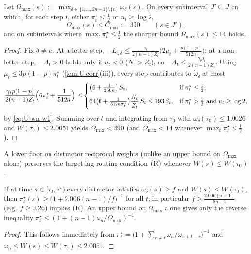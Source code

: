 \begin{lemma}
\label{lem:U-floor-max}
Let $\Omega_{\max}(s) := \max_{\delta\in\{1,\ldots,2n+1\}\setminus\{n\}}\omega_\delta(s)$. On every subinterval $J' \subseteq J$ on which, for each step $t$, either $\pi_t^\star \le \frac12$ or $u_t \ge \log 2$,
\[
  \Omega_{\max}(s) \le C_{\max} := 390 \qquad (s \in J'),
\]
and on subintervals where $\max_t\pi_t^\star \le \frac12$ the sharper bound $\Omega_{\max}(s) \le 14$ holds.
\end{lemma}
\begin{proof}
Fix $\delta \ne n$. At a letter step, $-L_{t,\delta} \le \frac{\gamma_t}{2(n-1)Z_t}\bigl(2\mu_t + \frac{p(1-p)}{512n}\bigr)$; at a non-letter step, $-A_t > 0$ holds only if $u_t < 0$ ($N_t > Z_t$), so $-A_t \le \frac{\gamma_t\mu_t}{2(n-1)Z_t}$. Using $\mu_t \le 3p(1-p)\pi_t^\star$ (\cref{lem:U-corr}(iii)), every step contributes to $\dot\omega_\delta$ at most
\[
  \frac{\gamma_t p(1-p)}{2(n-1)Z_t}\Bigl(6\pi_t^\star + \frac{1}{512n}\Bigr)
  \le \begin{cases}
    \bigl(6 + \tfrac{1}{256n}\bigr)\,S_t, & \text{if } \pi_t^\star \le \frac{1}{2},\\[4pt]
    64\bigl(6 + \tfrac{1}{512n\pi_t^\star}\bigr)\dfrac{N_t}{Z_t}\,S_t \le 193\,S_t, & \text{if } \pi_t^\star > \frac{1}{2} \text{ and } u_t \ge \log 2,
  \end{cases}
\]
by \cref{eq:U-wn-w1}. Summing over $t$ and integrating from $\tau_0$ with $\omega_\delta(\tau_0) \le 1.0026$ and $W(\tau_0) \le 2.0051$ yields $\Omega_{\max} < 390$ (and $\Omega_{\max} < 14$ whenever $\max_t\pi_t^\star \le \frac{1}{2}$).
\end{proof}

A lower floor on distractor reciprocal weights (unlike an upper bound on $\Omega_{\max}$ alone) preserves the target-lag routing condition~(R) whenever $W(s) \le W(\tau_0)$.

\begin{lemma}
\label{lem:U-floor-pi}
If at time $s \in [\tau_0, \tau^\star)$ every distractor satisfies $\omega_\delta(s) \ge f$ and $W(s) \le W(\tau_0)$, then $\pi_t^\star(s) \ge \bigl(1 + 2.006(n-1)/f\bigr)^{-1}$ for all $t$; in particular $f \ge \frac{2.006(n-1)}{8n-1}$ (e.g.\ $f \ge 0.26$) implies (R). An upper bound on $\Omega_{\max}$ alone gives only the reverse inequality $\pi_t^\star \le (1 + (n-1)\omega_n/\Omega_{\max})^{-1}$.
\end{lemma}
\begin{proof}
This follows immediately from $\pi_t^\star = \bigl(1 + \sum_{r\ne t}\omega_n/\omega_{n+t-r}\bigr)^{-1}$ and $\omega_n \le W(s) \le W(\tau_0) \le 2.0051$.
\end{proof}

